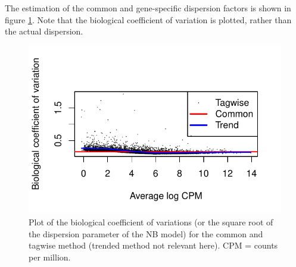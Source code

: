 \documentclass[a4paper,10pt]{article}\usepackage[]{graphicx}\usepackage[]{color}
\makeatletter
\def\maxwidth{ %
  \ifdim\Gin@nat@width>\linewidth
    \linewidth
  \else
    \Gin@nat@width
  \fi
}
\newenvironment{knitrout}{}{} %
\makeatother
\begin{document}
The estimation of the common and gene-specific dispersion factors is shown in figure \ref{edgeR-dispersion}. Note that the biological coefficient of variation is plotted, rather than the actual dispersion. 


\begin{figure}[H]
  \centering
\begin{knitrout}
\color{fgcolor}

{\centering \includegraphics[width=\maxwidth]{figures/plots-edgeR-dispersion-plot-1} 

}



\end{knitrout}
\caption{Plot of the biological coefficient of variations (or the square root of the dispersion parameter of the NB model) for the common and tagwise method (trended method not relevant here). CPM = counts per million.}
\label{edgeR-dispersion}
\end{figure}
\end{document}
